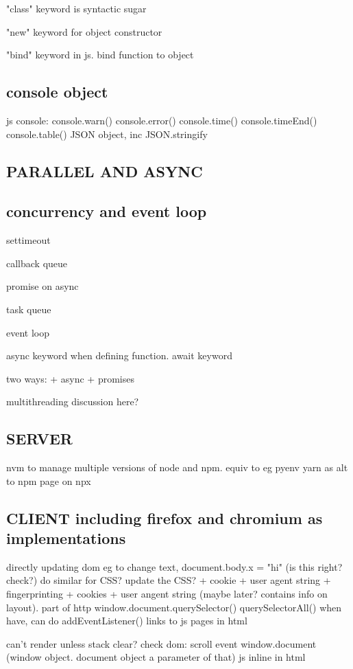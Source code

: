 "class" keyword is syntactic sugar

"new" keyword for object constructor

"bind" keyword in js. bind function to object
\subsection{console object}
js console:
console.warn()
console.error()
console.time()
console.timeEnd()
console.table()
JSON object, inc JSON.stringify
\subsection{PARALLEL AND ASYNC}
\subsection{concurrency and event loop}
settimeout

callback queue

promise on async

task queue

event loop

async keyword when defining function. await keyword

two ways:
+ async
+ promises

multithreading discussion here?
\subsection{SERVER}
nvm to manage multiple versions of node and npm. equiv to eg pyenv
yarn as alt to npm
page on npx
\subsection{CLIENT including firefox and chromium as implementations}
directly updating dom
eg to change text, document.body.x = "hi" (is this right? check?)
do similar for CSS? update the CSS?
+ cookie
+ user agent string
+ fingerprinting
+ cookies
+ user angent string (maybe later? contains info on layout). part of http
window.document.querySelector()
querySelectorAll()
when have, can do addEventListener()
links to js pages in html

can't render unless stack clear? check
dom: scroll event
window.document (window object. document object a parameter of that)
js inline in html

